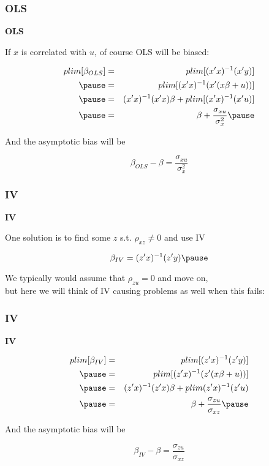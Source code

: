 \documentclass{beamer}
\begin{document}
\begin{frame}
\frametitle{OLS}
\textbf{OLS} \\ \medskip  \pause

If $x$ is correlated with $u$, of course OLS will be biased: \pause

\begin{eqnarray*}
plim[\beta_{OLS}]&=&plim[(x'x)^{-1}(x'y)] \\ \pause
&=&plim[(x'x)^{-1}(x'(x\beta+u))] \\ \pause
&=&(x'x)^{-1}(x'x)\beta+plim[(x'x)^{-1}(x'u)] \\ \pause
&=&\beta+\frac{\sigma_{xu}}{\sigma_x^2} \pause
\end{eqnarray*}

And the asymptotic bias will be \pause

\begin{equation*}
\beta_{OLS}-\beta=\frac{\sigma_{xu}}{\sigma_x^2} 
\end{equation*}

\end{frame}

\begin{frame}
\frametitle{IV}
\textbf{IV} \\ \medskip  \pause

One solution is to find some $z$ s.t. $\rho_{xz}\neq0$ and use IV \pause

\begin{equation*}
\beta_{IV}=(z'x)^{-1}(z'y) \pause
\end{equation*}

We typically would assume that $\rho_{zu}=0$ and move on, \\ \medskip \pause but here we will think of IV causing problems as well when this fails:

\end{frame}

\begin{frame}
\frametitle{IV}
\textbf{IV} \\ \medskip  \pause

\begin{eqnarray*}
plim[\beta_{IV}]&=&plim[(z'x)^{-1}(z'y)] \\ \pause
&=&plim[(z'x)^{-1}(z'(x\beta+u))] \\  \pause
&=&(z'x)^{-1}(z'x)\beta+plim(z'x)^{-1}(z'u) \\  \pause
&=&\beta+\frac{\sigma_{zu}}{\sigma_{xz}}  \pause
\end{eqnarray*}

And the asymptotic bias will be \pause

\begin{equation*}
\beta_{IV}-\beta=\frac{\sigma_{zu}}{\sigma_{xz}}
\end{equation*}

\end{frame}
\end{document}
